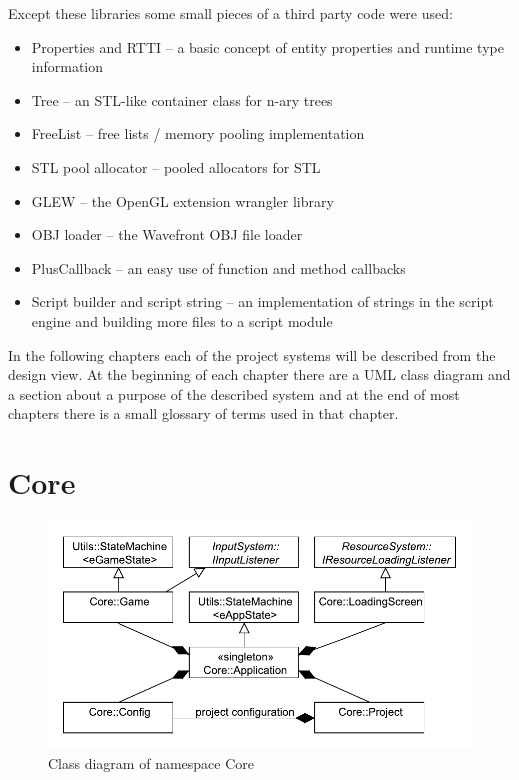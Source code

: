 \documentclass[a4paper, 12pt]{report}
\begin{document}
Except these libraries some small pieces of a third party code were used:

\begin{itemize}
  \item Properties and RTTI\cite{gpg5} -- a basic concept of entity properties and runtime type information
  \item Tree\cite{tree} -- an STL-like container class for n-ary trees
  \item FreeList\cite{gpg5} -- free lists / memory pooling implementation
  \item STL pool allocator\cite{allocator} -- pooled allocators for STL
  \item GLEW\cite{glew} -- the OpenGL extension wrangler library
  \item OBJ loader\cite{objloader} -- the Wavefront OBJ file loader
  \item PlusCallback\cite{pluscallback} -- an easy use of function and method callbacks
  \item Script builder and script string\cite{angelscript} -- an implementation of strings in the script engine and building more files to a script module
\end{itemize}

In the following chapters each of the project systems will be described from the design view. At the beginning of each chapter there are a UML class diagram and a section about a purpose of the described system and at the end of most chapters there is a small glossary of terms used in that chapter.


\chapter{Core}

\begin{figure}[htbp]
	\centering
		\includegraphics[width=1\textwidth]{CoreClassDiagram.pdf}
	\caption{Class diagram of namespace Core}
	\label{fig:core-diagram}
\end{figure}
\end{document}
